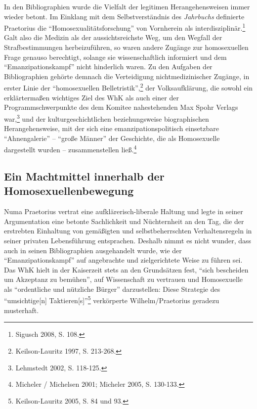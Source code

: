 \documentclass[a4paper,
fontsize=11pt,
oneside,
numbers=noperiodatend,
parskip=half-,
bibliography=totoc,
final
]{scrartcl}
\begin{document}
In den Bibliographien wurde die Vielfalt der legitimen Herangehensweisen
immer wieder betont. Im Einklang mit dem Selbstverständnis des
\emph{Jahrbuchs} definierte Praetorius die
\enquote{Homosexualitätsforschung} von Vornherein als
interdisziplinär.\footnote{Sigusch 2008, S. 108.} Galt also die Medizin
als der aussichtsreichste Weg, um den Wegfall der Strafbestimmungen
herbeizuführen, so waren andere Zugänge zur homosexuellen Frage genauso
berechtigt, solange sie wissenschaftlich informiert und dem
\enquote{Emanzipationskampf} nicht hinderlich waren. Zu den Aufgaben der
Bibliographien gehörte demnach die Verteidigung nichtmedizinischer
Zugänge, in erster Linie der \enquote{homosexuellen
Belletristik},\footnote{Keilson-Lauritz 1997, S. 213-268.} der
Volksaufklärung, die sowohl ein erklärtermaßen wichtiges Ziel des WhK
als auch einer der Programmschwerpunkte des dem Komitee nahestehenden
Max Spohr Verlags war,\footnote{Lehmstedt 2002, S. 118-125.} und der
kulturgeschichtlichen beziehungsweise biographischen Herangehensweise,
mit der sich eine emanzipationspolitisch einsetzbare
\enquote{Ahnengalerie} -- \enquote{große Männer} der Geschichte, die als
Homosexuelle dargestellt wurden -- zusammenstellen ließ.\footnote{Micheler
  / Michelsen 2001; Micheler 2005, S. 130-133.}

\subsection*{Ein Machtmittel innerhalb der
Homosexuellenbewegung}\label{ein-machtmittel-innerhalb-der-homosexuellenbewegung}

Numa Praetorius vertrat eine aufklärerisch-liberale Haltung und legte in
seiner Argumentation eine betonte Sachlichkeit und Nüchternheit an den
Tag, die der erstrebten Einhaltung von gemäßigten und selbstbeherrschten
Verhaltensregeln in seiner privaten Lebensführung entsprachen. Deshalb
nimmt es nicht wunder, dass auch in seinen Bibliographien ausgehandelt
wurde, wie der \enquote{Emanzipationskampf} auf angebrachte und
zielgerichtete Weise zu führen sei. Das WhK hielt in der Kaiserzeit
stets an den Grundsätzen fest, \enquote{sich bescheiden um Akzeptanz zu
bemühen}, auf Wissenschaft zu vertrauen und Homosexuelle als
\enquote{ordentliche und nützliche Bürger} darzustellen: Diese Strategie
des \enquote{umsichtige{[}n{]} Taktieren{[}s{]}}\footnote{Keilson-Lauritz
  2005, S. 84 und 93.} verkörperte Wilhelm/Praetorius geradezu
musterhaft.
\end{document}
